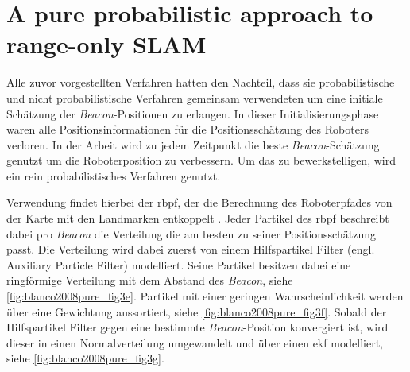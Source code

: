 %
%


%
%
%
\section{A pure probabilistic approach to range-only SLAM}\label{sec:blanco2008pure}

Alle zuvor vorgestellten Verfahren hatten den Nachteil, dass sie probabilistische und nicht probabilistische Verfahren gemeinsam verwendeten um eine initiale Schätzung der \textit{Beacon}-Positionen zu erlangen. In dieser Initialisierungsphase waren alle Positionsinformationen für die Positionsschätzung des Roboters verloren. In der Arbeit  \cite{blanco2008pure} wird zu jedem Zeitpunkt die beste \textit{Beacon}-Schätzung genutzt um die Roboterposition zu verbessern. Um das zu bewerkstelligen, wird ein rein probabilistisches Verfahren genutzt.

Verwendung findet hierbei der \Gls{rbpf}, der die Berechnung des Roboterpfades von der Karte mit den Landmarken entkoppelt \cite{murphy2001rao, montemerlo2002fastslam}. Jeder Partikel des \Gls{rbpf} beschreibt dabei pro \textit{Beacon} die Verteilung die am besten zu seiner Positionsschätzung passt. Die Verteilung wird dabei zuerst von einem Hilfspartikel Filter (engl. Auxiliary Particle Filter) modelliert. Seine Partikel besitzen dabei eine ringförmige Verteilung mit dem Abstand des \textit{Beacon}, siehe \autoref{fig:blanco2008pure_fig3e}. Partikel mit einer geringen Wahrscheinlichkeit werden über eine Gewichtung aussortiert, siehe \autoref{fig:blanco2008pure_fig3f}. Sobald der Hilfspartikel Filter gegen eine bestimmte \textit{Beacon}-Position konvergiert ist, wird dieser in einen Normalverteilung umgewandelt und über einen \Gls{ekf} modelliert, siehe \autoref{fig:blanco2008pure_fig3g}.

